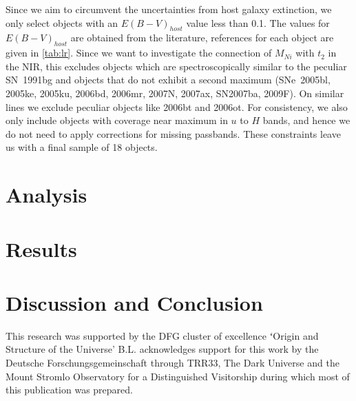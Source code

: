 \documentclass{aa}
\begin{document}
Since we aim to circumvent the uncertainties from host galaxy extinction, we only select objects with an $E(B-V)_{host}$ value
less than 0.1. The values for $E(B-V)_{host}$ are obtained from the literature, references for each object are given in \ref{tab:lr}. Since we want to investigate the connection of $M_{Ni}$ with $t_2$ in the NIR, this excludes objects which are spectroscopically similar  
to the
peculiar SN~1991bg \citep{Filippenko1992, Leibundgut1993, Mazzali1997} and
objects that do not exhibit a second maximum
(SNe~2005bl, 2005ke, 2005ku, 2006bd, 2006mr, 2007N, 2007ax, SN2007ba,
2009F). On similar lines we exclude peculiar objects like 2006bt and 2006ot. 
 For consistency, we also only include objects with coverage near maximum in $u$ to $H$ bands, and hence we do not need to apply corrections for missing passbands. 
These constraints leave us with a final sample of 18 objects. 


 

\section{Analysis}
\label{sec-ana}


\section{Results}
\label{sec-res}


\section{Discussion and Conclusion}
\label{sec-dnc}






\begin{acknowledgements}
This research was supported by the DFG cluster of excellence ʻOrigin and
Structure of the Universe' 
B.L. acknowledges support for this work by the Deutsche
Forschungsgemeinschaft through TRR33, The Dark Universe and the Mount
Stromlo Observatory for a Distinguished Visitorship during which most of
this publication was prepared.

\end{acknowledgements}



%
\end{document}
